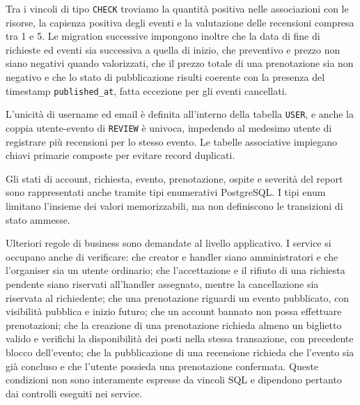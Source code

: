 Tra i vincoli di tipo \texttt{CHECK} troviamo la quantità positiva nelle associazioni con le risorse, la capienza positiva degli eventi e la valutazione delle recensioni compresa tra 1 e 5. Le migration successive impongono inoltre che la data di fine di richieste ed eventi sia successiva a quella di inizio, che preventivo e prezzo non siano negativi quando valorizzati, che il prezzo totale di una prenotazione sia non negativo e che lo stato di pubblicazione risulti coerente con la presenza del timestamp \texttt{published\_at}, fatta eccezione per gli eventi cancellati.

L'unicità di username ed email è definita all'interno della tabella \texttt{USER}, e anche la coppia utente-evento di \texttt{REVIEW} è univoca, impedendo al medesimo utente di registrare più recensioni per lo stesso evento. Le tabelle associative impiegano chiavi primarie composte per evitare record duplicati.

Gli stati di account, richiesta, evento, prenotazione, ospite e severità del report sono rappresentati anche tramite tipi enumerativi PostgreSQL. I tipi enum limitano l'insieme dei valori memorizzabili, ma non definiscono le transizioni di stato ammesse.

Ulteriori regole di business sono demandate al livello applicativo. I service si occupano anche di verificare: che creator e handler siano amministratori e che l'organiser sia un utente ordinario; che l'accettazione e il rifiuto di una richiesta pendente siano
riservati all'handler assegnato, mentre la cancellazione sia
riservata al richiedente; che una prenotazione riguardi un evento pubblicato, con visibilità pubblica e inizio futuro; che un account bannato non possa effettuare prenotazioni; che la creazione di una prenotazione richieda almeno un biglietto valido e verifichi la disponibilità dei posti nella stessa transazione, con precedente blocco dell'evento; che la pubblicazione di una recensione richieda che l'evento sia già concluso e che l'utente possieda una prenotazione confermata. Queste condizioni non sono interamente espresse da vincoli SQL e dipendono pertanto dai controlli eseguiti nei service.

